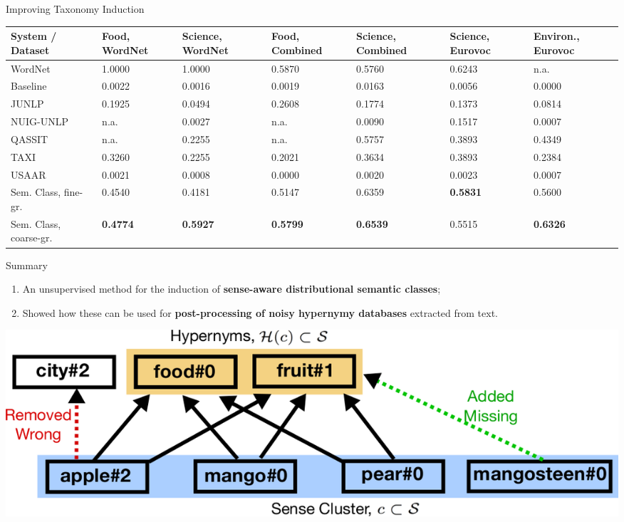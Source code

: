 \documentclass[usenames,dvipsnames]{beamer}
\begin{document}
\begin{frame}{ Improving Taxonomy Induction }


\begin{table}
\scriptsize
\centering
\begin{tabular}{p{2.6cm}|p{1cm}|p{1cm}|p{1cm}|p{1cm}|p{1cm}|p{1cm}}
\textbf{System / Dataset} & \textbf{Food, WordNet} & \textbf{Science, WordNet}& \textbf{Food, Combined} & \textbf{Science, Combined} & \textbf{Science, Eurovoc} & \textbf{Environ., Eurovoc} \\ \toprule

WordNet & 1.0000 & 1.0000 & 0.5870 & 0.5760 & 0.6243 & n.a. \\ \midrule

Baseline & 0.0022 & 0.0016 & 0.0019 & 0.0163 & 0.0056 & 0.0000 \\
JUNLP & 0.1925 & 0.0494 & 0.2608 & 0.1774 & 0.1373 & 0.0814 \\
NUIG-UNLP & n.a. & 0.0027 & n.a. & 0.0090 & 0.1517 & 0.0007 \\
QASSIT & n.a. & 0.2255 & n.a. & 0.5757 & 0.3893 & 0.4349 \\
TAXI & 0.3260 & 0.2255 & 0.2021 & 0.3634 & 0.3893 & 0.2384 \\
USAAR & 0.0021 & 0.0008 & 0.0000 & 0.0020 & 0.0023 & 0.0007 \\ \midrule

Sem. Class, fine-gr. & 0.4540 & 0.4181 & 0.5147 & 0.6359 &  \textbf{0.5831} & 0.5600 \\
Sem. Class, coarse-gr. & \textbf{0.4774} & \textbf{0.5927} & \textbf{0.5799} & \textbf{0.6539} & 0.5515 & \textbf{0.6326} 
\end{tabular}
\end{table}


\end{frame}



\begin{frame}{ Summary }

\begin{enumerate}
	\item An unsupervised method for the induction of \textbf{\alert{sense-aware distributional semantic classes}};
	\item Showed how these can be used for \textbf{\alert{post-processing of noisy hypernymy databases}} extracted from text.
\end{enumerate}


\begin{center}
\includegraphics[width=.9\textwidth]{figures/coset}
\end{center}

\end{frame}
\end{document}
